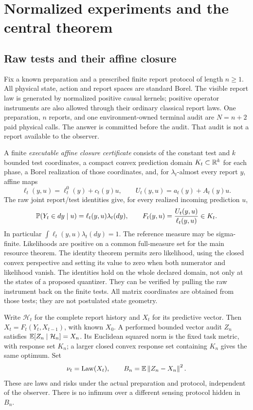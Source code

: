 \section{Normalized experiments and the central theorem}\label{sec:setup}
\subsection{Raw tests and their affine closure}
Fix a known preparation and a prescribed finite report protocol of length $n\ge1$. All physical state, action and report spaces are standard Borel. The visible report law is generated by normalized positive causal kernels; positive operator instruments are also allowed through their ordinary classical report laws. One preparation, $n$ reports, and one environment-owned terminal audit are $N=n+2$ paid physical calls. The answer is committed before the audit. That audit is not a report available to the observer.

A finite \emph{executable affine closure certificate} consists of the constant test and $k$ bounded test coordinates, a compact convex prediction domain $K_t\subset\mathbb R^k$ for each phase, a Borel realization of those coordinates, and, for $\lambda_t$-almost every report $y$, affine maps
\[
 \ell_t(y,u)=\ell_t^0(y)+c_t(y)u,\qquad
 U_t(y,u)=a_t(y)+A_t(y)u.
\]
The raw joint report/test identities give, for every realized incoming prediction $u$,
\begin{equation}\label{eq:instrument}
 \mathbb P(Y_t\in dy\mid u)=\ell_t(y,u)\lambda_t(dy),\qquad
 F_t(y,u)=\frac{U_t(y,u)}{\ell_t(y,u)}\in K_t.
\end{equation}
In particular $\int\ell_t(y,u)\lambda_t(dy)=1$. The reference measure may be sigma-finite. Likelihoods are positive on a common full-measure set for the main resource theorem. The identity theorem permits zero likelihood, using the closed convex perspective and setting its value to zero when both numerator and likelihood vanish. The identities hold on the whole declared domain, not only at the states of a proposed quantizer. They can be verified by pulling the raw instrument back on the finite tests. All matrix coordinates are obtained from those tests; they are not postulated state geometry.

Write $\mathcal H_t$ for the complete report history and $X_t$ for its predictive vector. Then $X_t=F_t(Y_t,X_{t-1})$, with known $X_0$. A performed bounded vector audit $Z_n$ satisfies $\mathbb E[Z_n\mid\mathcal H_n]=X_n$. Its Euclidean squared norm is the fixed task metric, with response set $K_n$; a larger closed convex response set containing $K_n$ gives the same optimum. Set
\begin{equation}\label{eq:baseline}
 \nu_t=\operatorname{Law}(X_t),\qquad
 B_n=\mathbb E\left\lVert Z_n-X_n\right\rVert^2.
\end{equation}
These are laws and risks under the actual preparation and protocol, independent of the observer. There is no infimum over a different sensing protocol hidden in $B_n$.

